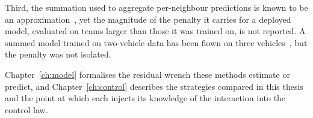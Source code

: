 Third, the summation used to aggregate per-neighbour predictions is known to be an
approximation~\cite{shi2020neuralswarm,gielis2023aggregate}, yet the magnitude of the penalty it
carries for a deployed model, evaluated on teams larger than those it was trained on, is not
reported. A summed model trained on two-vehicle data has been flown on three
vehicles~\cite{hsieh2025onlineadaptation}, but the penalty was not isolated.


Chapter~\ref{ch:model} formalises the residual wrench these methods estimate or predict, and
Chapter~\ref{ch:control} describes the strategies compared in this thesis and the point at
which each injects its knowledge of the interaction into the control law.
